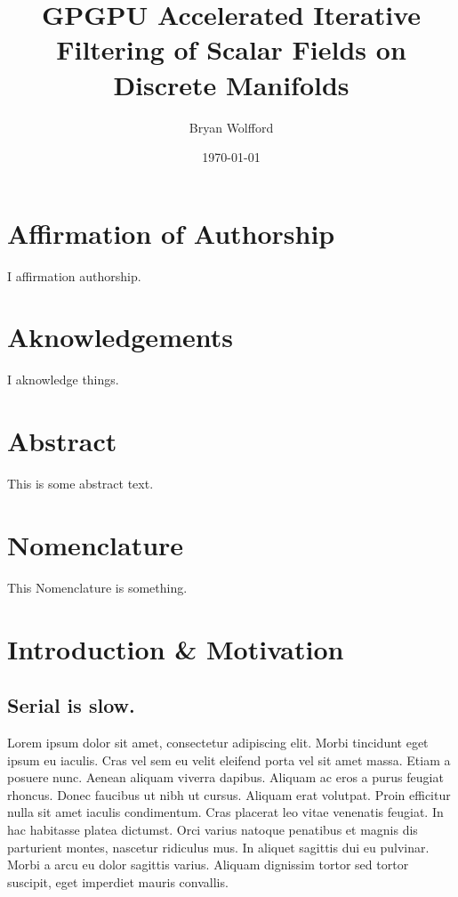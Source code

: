 \documentclass[openany]{book}
\author{Bryan Wolfford}
\title{GPGPU Accelerated Iterative Filtering of Scalar Fields on Discrete Manifolds}
\date{\today} %
\begin{document}
\frontmatter
\maketitle

\chapter{Affirmation of Authorship}
I affirmation authorship.

\chapter{Aknowledgements}
I aknowledge things.

\chapter{Abstract}
This is some abstract text.

\chapter{Nomenclature}
This Nomenclature is something.

\tableofcontents

\listoffigures
\listoftables



\mainmatter
\chapter{Introduction \& Motivation}
\section{Serial is slow.}
Lorem ipsum dolor sit amet, consectetur adipiscing elit. Morbi tincidunt eget 
ipsum eu iaculis. Cras vel sem eu velit eleifend porta vel sit amet massa. Etiam 
a posuere nunc. Aenean aliquam viverra dapibus. Aliquam ac eros a purus feugiat 
rhoncus. Donec faucibus ut nibh ut cursus. Aliquam erat volutpat. Proin efficitur 
nulla sit amet iaculis condimentum. Cras placerat leo vitae venenatis feugiat. In 
hac habitasse platea dictumst. Orci varius natoque penatibus et magnis dis 
parturient montes, nascetur ridiculus mus. In aliquet sagittis dui eu pulvinar. 
Morbi a arcu eu dolor sagittis varius. Aliquam dignissim tortor sed tortor 
suscipit, eget imperdiet mauris convallis.~\cite[p.~00]{SourceNeeded}
\end{document}
